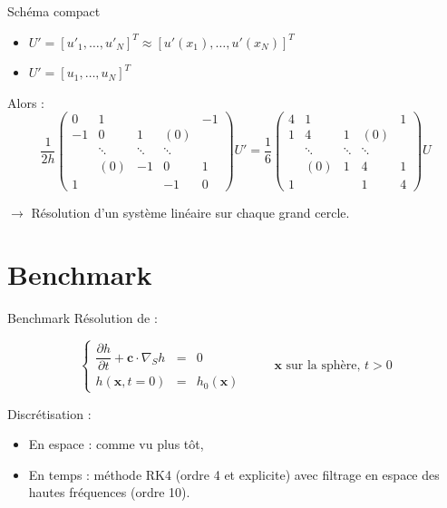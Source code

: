 \documentclass[11pt]{beamer}
\begin{document}
\begin{frame}
\begin{block}{Schéma compact}
\begin{itemize}
\item $U' = \left[ u'_1, \hdots ,u'_N \right]^T \approx \left[ u'(x_1), \hdots ,u'(x_N) \right]^T$

\item $U' = \left[ u_1, \hdots ,u_N \right]^T$
\end{itemize}

\pause

Alors :
$$\dfrac{1}{2h}\begin{pmatrix}
0 & 1 &   &   & -1 \\ 
-1 & 0 & 1 & (0) &   \\ 
  & \ddots & \ddots & \ddots &   \\ 
  & (0) & -1 & 0 & 1 \\ 
1 &   &   & -1 & 0
\end{pmatrix} U' = \dfrac{1}{6} \begin{pmatrix}
4 & 1 &   &   & 1 \\ 
1 & 4 & 1 & (0) &   \\ 
  & \ddots & \ddots & \ddots &   \\ 
  & (0) & 1 & 4 & 1 \\ 
1 &   &   & 1 & 4
\end{pmatrix} U$$
\end{block}
\pause
$\rightarrow$ Résolution d'un système linéaire sur chaque grand cercle.

\end{frame}


\section{Benchmark}
\begin{frame}{Benchmark}
Résolution de :

$$\left\{
\begin{array}{rcl}
\dfrac{\partial h}{\partial t} + \mathbf{c} \cdot \nabla_S h & = & 0 \\
h(\mathbf{x},t=0) & = & h_0 ( \mathbf{x} )
\end{array}
\right. \hspace{1cm} \mathbf{x} \text{ sur la sphère, } t>0$$

\pause

\begin{block}{Discrétisation : }

\begin{itemize}
\item En espace : comme vu plus tôt,

\item En temps : méthode RK4 (ordre 4 et explicite) avec filtrage en espace des hautes fréquences (ordre 10).
\end{itemize}
\end{block}
\end{frame}
\end{document}
